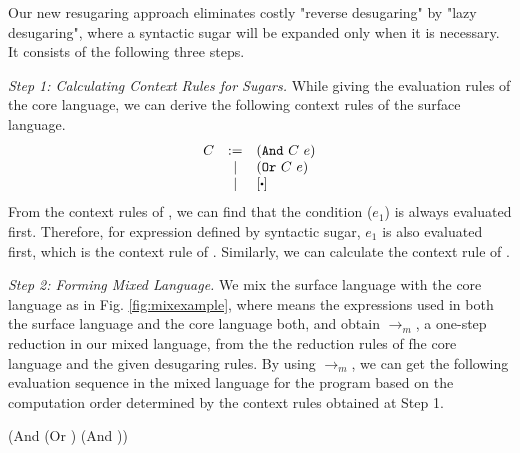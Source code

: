 Our new resugaring approach eliminates costly "reverse desugaring" by "lazy desugaring", where a syntactic sugar will be expanded only when it is necessary. It consists of the following three steps.

{\em Step 1: Calculating Context Rules for Sugars.}
While giving the evaluation rules of the core language, we can derive the following context rules of the surface language.
\[
\begin{array}{lcl}
C &:=& (\m{And}~C~e)\\
&|& (\m{Or}~C~e)\\
&|&[\bigcdot]\\
\end{array}
\]
From the context rules of , we can find that the condition ($e_1$) is always evaluated first. Therefore, for expression  defined by syntactic sugar, $e_1$ is also evaluated first, which is the context rule of . Similarly, we can calculate the context rule of .

{\em Step 2: Forming Mixed Language.}
We mix the surface language with the core language as in Fig. \ref{fig:mixexample}, where  means the expressions used in both the surface language and the core language both, and obtain $\to_m$, a one-step reduction in our mixed language, from the the reduction rules of fhe core language and the given desugaring rules. By using $\to_m$, we can get the following evaluation sequence in the mixed language for
the program  based on the computation order determined by the context rules obtained at Step 1.

{\footnotesize
\begin{Codes}
    (And (Or \true \false) (And \false \true))
\OneStep{ \false}
\end{Codes}
}


